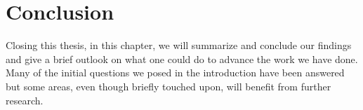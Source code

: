 
\iffalse
\fi

\chapter{Conclusion}\label{chap:conclusion}

Closing this thesis, in this chapter, we will summarize and conclude our findings 
and give a brief outlook on what one could do to advance the work we have done.
Many of the initial questions we posed in the introduction have been answered
but some areas, even though briefly touched upon, will benefit from further research.


